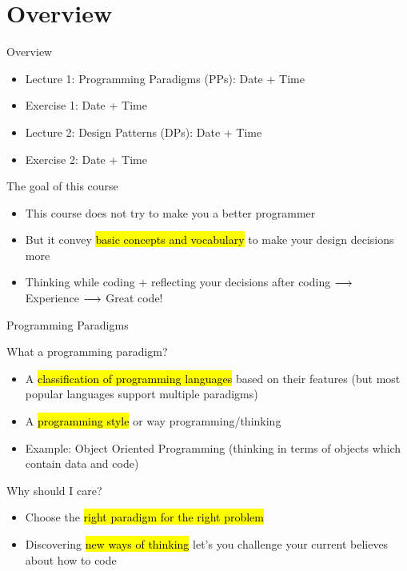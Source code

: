 \section{Overview}

\begin{frame}{Overview}
	\begin{itemize}
	\item Lecture 1: Programming Paradigms (PPs): Date + Time
	\item Exercise 1: Date + Time
	\item Lecture 2: Design Patterns (DPs): Date + Time
	\item Exercise 2: Date + Time
	\end{itemize}
	
	\begin{block}{The goal of this course}
		\begin{itemize}
			\item This course does not try to make you a better programmer
			\item But it  convey \hl{basic concepts and vocabulary} to make your design decisions more 
			\item Thinking while coding + reflecting your decisions after coding $\longrightarrow$ Experience $\longrightarrow$ Great code!
		\end{itemize}
	\end{block}
\end{frame}



\begin{frame}{Programming Paradigms}
	\begin{block}{What  a programming paradigm?}
		\begin{itemize}
			\item A \hl{classification of programming languages} based on their features {\small (but most popular languages support multiple paradigms)}
			\item A \hl{programming style} or way programming/thinking
			\item Example: Object Oriented Programming {\small (thinking in terms of objects which contain data and code)}
		\end{itemize}
	\end{block}
	\begin{block}{Why should I care?}
		\begin{itemize}
			\item Choose the \hl{right paradigm for the right problem}
			\item Discovering \hl{new ways of thinking} let's you challenge your current believes about how to code 
		\end{itemize}
	\end{block}
\end{frame}


